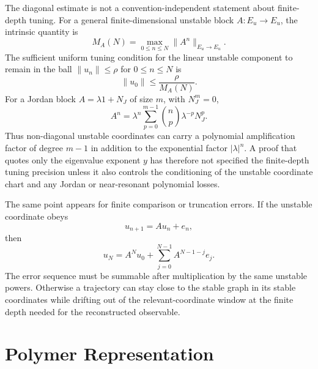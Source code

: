 The diagonal estimate is not a convention-independent statement about
finite-depth tuning.  For a general finite-dimensional unstable block
\(A:E_u\to E_u\), the intrinsic quantity is
\begin{equation}
  M_A(N)=\max_{0\leq n\leq N}\|A^n\|_{E_u\to E_u}.
  \label{eq:unstable-block-finite-depth-amplification}
\end{equation}
The sufficient uniform tuning condition for the linear unstable component to
remain in the ball \(\|u_n\|\leq\rho\) for \(0\leq n\leq N\) is
\begin{equation}
  \|u_0\|\leq \frac{\rho}{M_A(N)}.
  \label{eq:unstable-block-finite-depth-tuning}
\end{equation}
For a Jordan block \(A=\lambda 1+N_J\) of size \(m\), with \(N_J^m=0\),
\begin{equation}
  A^n
  =
  \lambda^n
  \sum_{p=0}^{m-1}
    \binom{n}{p}\lambda^{-p}N_J^p .
  \label{eq:jordan-unstable-block-power}
\end{equation}
Thus non-diagonal unstable coordinates can carry a polynomial amplification
factor of degree \(m-1\) in addition to the exponential factor
\(|\lambda|^n\).  A proof that quotes only the eigenvalue exponent \(y\) has
therefore not specified the finite-depth tuning precision unless it also
controls the conditioning of the unstable coordinate chart and any Jordan or
near-resonant polynomial losses.

The same point appears for finite comparison or truncation errors.  If the
unstable coordinate obeys
\[
  u_{n+1}=Au_n+e_n ,
\]
then
\begin{equation}
  u_N=A^Nu_0+\sum_{j=0}^{N-1}A^{N-1-j}e_j .
  \label{eq:unstable-block-error-amplification}
\end{equation}
The error sequence must be summable after multiplication by the same unstable
powers.  Otherwise a trajectory can stay close to the stable graph in its
stable coordinates while drifting out of the relevant-coordinate window at the
finite depth needed for the reconstructed observable.

\section{Polymer Representation}

